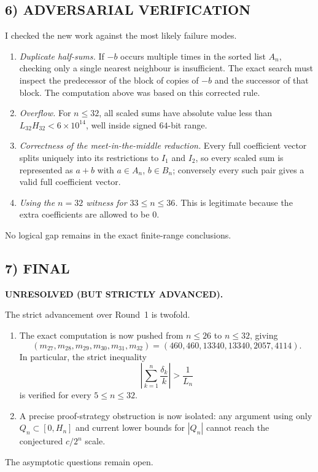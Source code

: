 \subsection*{6) ADVERSARIAL VERIFICATION}
I checked the new work against the most likely failure modes.
\begin{enumerate}
\item \emph{Duplicate half-sums.}  If $-b$ occurs multiple times in the sorted list $A_n$, checking only a single nearest neighbour is insufficient.  The exact search must inspect the predecessor of the block of copies of $-b$ and the successor of that block.  The computation above was based on this corrected rule.
\item \emph{Overflow.}  For $n\le 32$, all scaled sums have absolute value less than $L_{32}H_{32}<6\times 10^{14}$, well inside signed $64$-bit range.
\item \emph{Correctness of the meet-in-the-middle reduction.}  Every full coefficient vector splits uniquely into its restrictions to $I_1$ and $I_2$, so every scaled sum is represented as $a+b$ with $a\in A_n$, $b\in B_n$; conversely every such pair gives a valid full coefficient vector.
\item \emph{Using the $n=32$ witness for $33\le n\le 36$.}  This is legitimate because the extra coefficients are allowed to be $0$.
\end{enumerate}
No logical gap remains in the exact finite-range conclusions.

\subsection*{7) FINAL}
\textbf{UNRESOLVED (BUT STRICTLY ADVANCED).}

The strict advancement over Round~1 is twofold.
\begin{enumerate}
\item The exact computation is now pushed from $n\le 26$ to $n\le 32$, giving
\[
(m_{27},m_{28},m_{29},m_{30},m_{31},m_{32})=(460,460,13340,13340,2057,4114).
\]
In particular, the strict inequality
\[
\left|\sum_{k=1}^n \frac{\delta_k}{k}\right|>\frac1{L_n}
\]
is verified for every $5\le n\le 32$.
\item A precise proof-strategy obstruction is now isolated: any argument using only $Q_n\subset [0,H_n]$ and current lower bounds for $|Q_n|$ cannot reach the conjectured $c/2^n$ scale.
\end{enumerate}
The asymptotic questions remain open.

